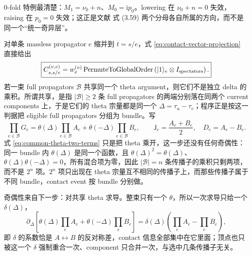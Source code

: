 \documentclass[11pt,a4paper]{ctexart}
\newcommand{\ii}{\mathrm i}
\begin{document}
0-fold 特例最清楚：$M_1=\nu_0+n$、$M_0=\ii p_0$。lowering 在 $\nu_0+n=0$ 失效，raising 在 $p_0=0$ 失效；这正是文献 \cite{Chen:2023eic} 式 (3.59) 两个分母各自所属的方向，而不是同一个“统一奇异层”。

对单条 massless propagator $e$ 缩并到 $t=s/e$，式 \eqref{eq:contact-vector-projection} 直接给出
\begin{equation}
 \boxed{
 C_{s,s/e}^{(v,e)}
 =w_e^{(v)}
 \operatorname{PermuteToGlobalOrder}
 \left(|1\rangle_e\otimes I_{\rm spectators}\right).
 }
 \label{eq:contact-injection}
\end{equation}
若一束 full propagators $\mathcal B$ 共享同一个 theta argument，则它们不是独立 delta 的乘积。所谓共享，是指 $|\mathcal B|\geq2$ 条 full propagators 的两端分别落在同两个 current components 上，于是它们的 theta 宗量都是同一个 $\Delta=\tau_u-\tau_v$；程序正是按这一判据把 eligible full propagators 分组为 bundle。写
\begin{equation}
 \prod_{e\in\mathcal B}G_e
 =\theta(\Delta)\prod_{e\in\mathcal B}A_e
 +\theta(-\Delta)\prod_{e\in\mathcal B}B_e,
 \qquad
 \mathsf J_e=\frac{A_e+B_e}{2},\quad D_e=A_e-B_e.
 \label{eq:common-theta-two-terms}
\end{equation}
式 \eqref{eq:common-theta-two-terms} 只是把 theta 乘开，这一步还没有任何奇偶性：同一 bundle 内 $\theta(\Delta)$ 是同一个函数，且 $\theta(\Delta)^2=\theta(\Delta)$、$\theta(\Delta)\theta(-\Delta)=0$，所有混合项为零，因此 $|\mathcal B|=n$ 条传播子的乘积只剩两项，而不是 $2^n$ 项。$2^n$ 项只出现在 theta 宗量互不相同的传播子上，而那些传播子属于不同 bundle，contact event 按 bundle 分别做。

奇偶性来自下一步：对共享 theta 求导。整束只有一个 $\theta$，所以一次求导只给一个 $\delta(\Delta)$，
\begin{equation}
 \partial_\Delta\!\left[\theta(\Delta)\prod_eA_e
 +\theta(-\Delta)\prod_eB_e\right]
 =\delta(\Delta)\left(\prod_eA_e-\prod_eB_e\right),
 \label{eq:common-theta-delta}
\end{equation}
即 $\delta$ 的系数恰是 $A\leftrightarrow B$ 的反对称差，contact 信息全部集中在它里面；顶点也只被这一个 $\delta$ 强制重合一次、component 只合并一次，与选中几条传播子无关。
\end{document}
